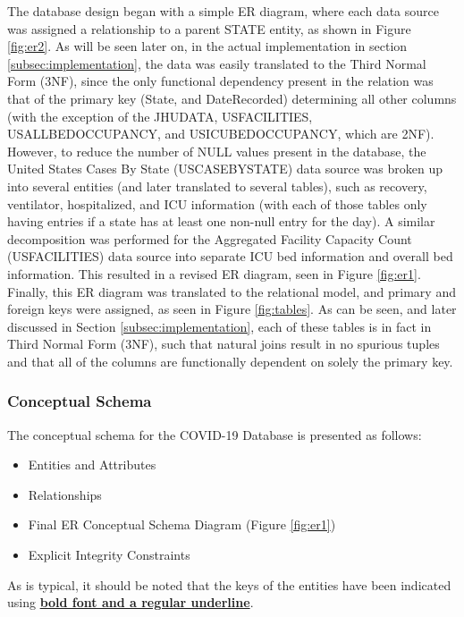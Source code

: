 \documentclass[11pt]{article}
\begin{document}
\noindent
The database design began with a simple ER diagram, where each data source was assigned a relationship to a parent STATE entity, as shown in Figure \ref{fig:er2}. As will be seen later on, in the actual implementation in section \ref{subsec:implementation}, the data was easily translated to the Third Normal Form (3NF), since the only functional dependency present in the relation was that of the primary key (State, and DateRecorded) determining all other columns (with the exception of the JHUDATA, USFACILITIES, USALLBEDOCCUPANCY, and USICUBEDOCCUPANCY, which are 2NF). However, to reduce the number of NULL values present in the database, the United States Cases By State (USCASEBYSTATE) data source was broken up into several entities (and later translated to several tables), such as recovery, ventilator, hospitalized, and ICU information (with each of those tables only having entries if a state has at least one non-null entry for the day). A similar decomposition was performed for the Aggregated Facility Capacity Count (USFACILITIES) data source into separate ICU bed information and overall bed information. This resulted in a revised ER diagram, seen in Figure \ref{fig:er1}. Finally, this ER diagram was translated to the relational model, and primary and foreign keys were assigned, as seen in Figure \ref{fig:tables}. As can be seen, and later discussed in Section \ref{subsec:implementation}, each of these tables is in fact in Third Normal Form (3NF), such that natural joins result in no spurious tuples and that all of the columns are functionally dependent on solely the primary key. 

\subsubsection{Conceptual Schema}
\label{subsubsec:concept}

\noindent
The conceptual schema for the COVID-19 Database is presented as follows:

\begin{itemize}
    \item Entities and Attributes
    \item Relationships
    \item Final ER Conceptual Schema Diagram (Figure \ref{fig:er1})
    \item Explicit Integrity Constraints
\end{itemize}

\noindent
As is typical, it should be noted that the keys of the entities have been indicated using \textbf{\underline{bold font and a regular underline}}.
\end{document}
